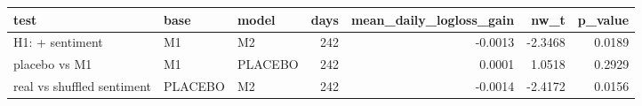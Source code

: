 \begin{tabular}{lllrrrr}
\toprule
test & base & model & days & mean\_daily\_logloss\_gain & nw\_t & p\_value \\
\midrule
H1: + sentiment & M1 & M2 & 242 & -0.0013 & -2.3468 & 0.0189 \\
placebo vs M1 & M1 & PLACEBO & 242 & 0.0001 & 1.0518 & 0.2929 \\
real vs shuffled sentiment & PLACEBO & M2 & 242 & -0.0014 & -2.4172 & 0.0156 \\
\bottomrule
\end{tabular}
